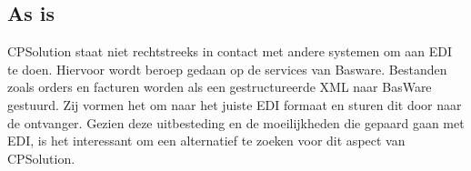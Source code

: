 \subsection{As is}
CPSolution staat niet rechtstreeks in contact met andere systemen om aan EDI te doen. Hiervoor wordt beroep gedaan op de services van Basware. Bestanden zoals orders en facturen worden als een gestructureerde XML naar BasWare gestuurd. Zij vormen het om naar het juiste EDI formaat en sturen dit door naar de ontvanger. Gezien deze uitbesteding en de moeilijkheden die gepaard gaan met EDI, is het interessant om een alternatief te zoeken voor dit aspect van CPSolution.




